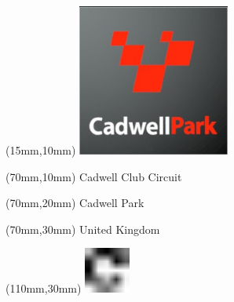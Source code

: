 \null\newpage
\begin{textblock*}{50mm}(15mm,10mm)%
\includegraphics[width=50mm]{LG/2015-05-20_00076.png}
\end{textblock*}
\begin{textblock*}{130mm}(70mm,10mm)%
{\fontsize{20}{20}\selectfont Cadwell Club Circuit}\\
\end{textblock*}
\begin{textblock*}{120mm}(70mm,20mm)%
{\fontsize{16}{16}\selectfont Cadwell Park}\\
\end{textblock*}
\begin{textblock*}{120mm}(70mm,30mm)%
{\fontsize{12}{12}\selectfont United Kingdom}
\end{textblock*}
\begin{textblock*}{30mm}(110mm,30mm)%
\centering
\includegraphics[height=15mm]{icons/fa-rotate-right.pdf}
\end{textblock*}
